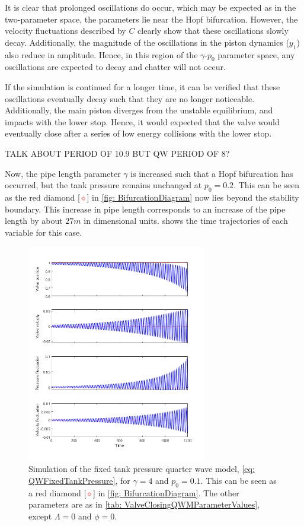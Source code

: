 It is clear that prolonged oscillations do occur, which may be expected as in the two-parameter space, the parameters lie near the Hopf bifurcation. However, the velocity fluctuations described by $C$ clearly show that these oscillations slowly decay. Additionally, the magnitude of the oscillations in the piston dynamics ($y_1$) also reduce in amplitude. Hence, in this region of the $\gamma$-$p_0$ parameter space, any oscillations are expected to decay and chatter will not occur.

If the simulation is continued for a longer time, it can be verified that these oscillations eventually decay such that they are no longer noticeable. Additionally, the main piston diverges from the unstable equilibrium, and impacts with the lower stop. Hence, it would expected that the valve would eventually close after a series of low energy collisions with the lower stop.

TALK ABOUT PERIOD OF 10.9 BUT QW PERIOD OF 8?

Now, the pipe length parameter $\gamma$ is increased such that a Hopf bifurcation has occurred, but the tank pressure remains unchanged at $p_0 = 0.2$. This can be seen as the red diamond [\textcolor{Red}{$\diamond$}] in \cref{fig: BifurcationDiagram} now lies beyond the stability boundary. This increase in pipe length corresponds to an increase of the pipe length by about $27 \si{m}$ in dimensional units.  shows the time trajectories of each variable for this case. 
~
\begin{figure}[ht]
    \centering
    \includegraphics[width=0.7\textwidth]{Figures/CloseToHopf/HopfUnstableLong.png}
    \caption{Simulation of the fixed tank pressure quarter wave model, \cref{eq: QWFixedTankPressure}, for $\gamma = 4$ and $p_0 = 0.1$. This can be seen as a red diamond [\textcolor{Red}{$\diamond$}] in \cref{fig: BifurcationDiagram}. The other parameters are as in \cref{tab: ValveClosingQWMParameterValues}, except $\Lambda=0$ and $\phi=0$.}
    \label{fig: UnstableHopf(Long)}
\end{figure}

